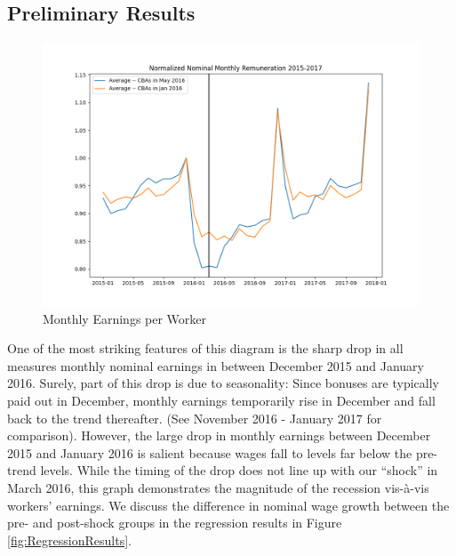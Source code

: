 \documentclass[12pt]{article}
\begin{document}
		\subsection{Preliminary Results}
		\begin{figure}[!ht]
			\centering
			\caption{Monthly Earnings per Worker}
			\label{fig:NormWages}
			\includegraphics[scale = .65]{tables-figures/normalized_avg_rem_2015_2017.png}
		\end{figure}
		One of the most striking features of this diagram is the sharp drop in all measures monthly nominal earnings in between December 2015 and January 2016. Surely, part of this drop is due to seasonality: Since bonuses are typically paid out in December, monthly earnings temporarily rise in December and fall back to the trend thereafter. (See November 2016 - January 2017 for comparison). However, the large drop in monthly earnings between December 2015 and January 2016 is salient because wages fall to levels far below the pre-trend levels. While the timing of the drop does not line up with our ``shock'' in March 2016, this graph demonstrates the magnitude of the recession vis-à-vis workers' earnings.  We discuss the difference in nominal wage growth between the pre- and post-shock groups in the regression results in Figure \ref{fig:RegressionResults}.
\end{document}
